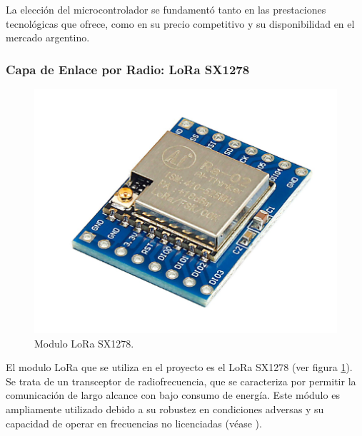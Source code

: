 La elección del microcontrolador se fundamentó tanto en las prestaciones tecnológicas que ofrece, como en su precio competitivo y su disponibilidad en el mercado argentino.

\subsubsection{Capa de Enlace por Radio: LoRa SX1278}

\begin{figure}[H]
	\centering
	\includegraphics[scale=1]{./Figures/Hardware/Modulos/LoRa.png}
	\caption{Modulo LoRa SX1278.}
	\label{fig:LoRa}
\end{figure}

\label{sec:LoRa}
El modulo LoRa que se utiliza en el proyecto es el LoRa SX1278 (ver figura \ref{fig:LoRa}). Se trata de un transceptor de radiofrecuencia, que se caracteriza por permitir la comunicación de largo alcance con bajo consumo de energía. Este módulo es ampliamente utilizado debido a su robustez en condiciones adversas y su capacidad de operar en frecuencias no licenciadas (véase \cite{LoraDatasheet}).

